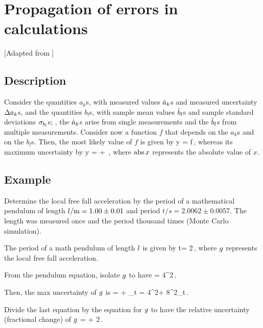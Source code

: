 \chapter*{Propagation of errors in calculations}
%
[Adapted from \citep[p. 47]{oldenburg:2014}]


\newcommand{\period}{t}


\section*{Description}
%
Consider the quantities $a_k$s, with measured values $\mvalue a_k$s and measured uncertainty $\muncer a_k$s, and the quantities $b_l$s, with sample mean values $\smean b_l$s and sample standard deviations $\sstdev_{b_l}$s; \ie, the $\mvalue a_k$s arise from single measurements and the $\smean b_l$s from multiple measurements. Consider now a function $f$ that depends on the $a_k$s and on the $b_l$s. Then, the most likely value of $f$ is given by
%
\beq
    \mvalue y = f\,,
\eeq
%
whereas its maximum uncertainty by
%
\beq
    \muncer y =  + \,,
\eeq
%
where $\abs x$ represents the absolute value of $x$.


\section*{Example}
%
Determine the local free fall acceleration by the period of a mathematical pendulum of length $\length/\si{m} = 1.00 \pm 0.01$ and period $\period/\si{s} = 2.0062 \pm 0.0057$. The length was measured once and the period thousand times (Monte Carlo simulation).

The period of a math pendulum of length $\length$ is given by
%
\beq
    \period = 2\pi\sqrt{\dfrac{\length}{\grav}}\,,
\eeq
%
where $\grav$ represents the local free fall acceleration.

From the pendulum equation, isolate $\grav$ to have
%
\beq
    \grav = 4\pi^2\dfrac{\length}{\period^2}\,.
\eeq

Then, the max uncertainty of $\grav$ is
%
\beq
    \muncer\grav = \abs\ipd{\length}\grav\muncer\length + \abs\ipd{\period}\grav\sstdev_\period
                 = 4\pi^2\dfrac{1}{\period^2}\muncer\length + 8\pi^2\dfrac{\length}{\period^3}\sstdev_\period\,.
\eeq

Divide the last equation by the equation for $\grav$ to have the relative uncertainty (fractional change) of $\grav$
%
\beq
    \dfrac{\muncer\grav}{\grav} = \dfrac{\muncer\length}{\length} + 2\dfrac{\sstdev_\period}{\period}\,.
\eeq

